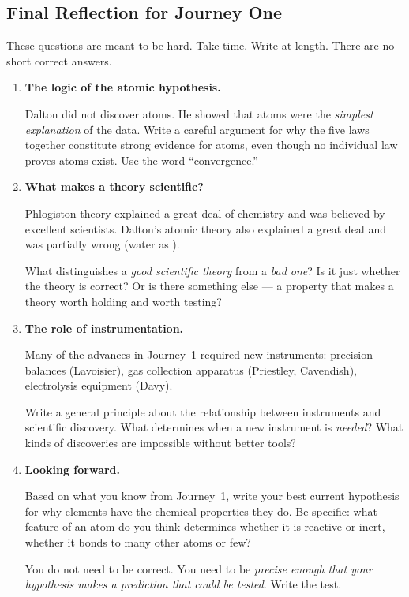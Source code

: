 \documentclass[12pt, a4paper]{book}
\theoremstyle{definition}
\begin{document}
\subsection*{Final Reflection for Journey One}

\begin{reflectionbox}
These questions are meant to be hard.
Take time. Write at length.
There are no short correct answers.

\begin{enumerate}[label=\textbf{R\arabic*.}]
  \item \textbf{The logic of the atomic hypothesis.}

        Dalton did not discover atoms.
        He showed that atoms were the \emph{simplest explanation}
        of the data.
        Write a careful argument for why the five laws together
        constitute strong evidence for atoms,
        even though no individual law proves atoms exist.
        Use the word ``convergence.''

  \item \textbf{What makes a theory scientific?}

        Phlogiston theory explained a great deal of chemistry
        and was believed by excellent scientists.
        Dalton's atomic theory also explained a great deal
        and was partially wrong (water as ).

        What distinguishes a \emph{good scientific theory}
        from a \emph{bad one}?
        Is it just whether the theory is correct?
        Or is there something else --- a property that makes
        a theory worth holding and worth testing?

  \item \textbf{The role of instrumentation.}

        Many of the advances in Journey~1 required new instruments:
        precision balances (Lavoisier), gas collection apparatus
        (Priestley, Cavendish), electrolysis equipment (Davy).

        Write a general principle about the relationship between
        instruments and scientific discovery.
        What determines when a new instrument is \emph{needed}?
        What kinds of discoveries are impossible without better tools?

  \item \textbf{Looking forward.}

        Based on what you know from Journey~1,
        write your best current hypothesis for why
        elements have the chemical properties they do.
        Be specific: what feature of an atom do you think
        determines whether it is reactive or inert,
        whether it bonds to many other atoms or few?

        You do not need to be correct.
        You need to be \emph{precise enough that your hypothesis
        makes a prediction that could be tested}.
        Write the test.
\end{enumerate}
\end{reflectionbox}
\end{document}
